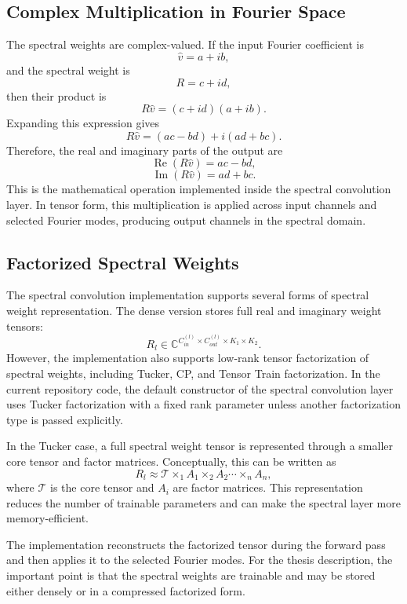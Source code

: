 \documentclass[14pt]{extarticle}
\begin{document}
\subsection{Complex Multiplication in Fourier Space}

The spectral weights are complex-valued. If the input Fourier coefficient is
\[
\hat{v}
=
a + ib,
\]
and the spectral weight is
\[
R
=
c + id,
\]
then their product is
\[
R\hat{v}
=
(c+id)(a+ib).
\]
Expanding this expression gives
\[
R\hat{v}
=
(ac-bd)
+
i(ad+bc).
\]
Therefore, the real and imaginary parts of the output are
\[
\operatorname{Re}(R\hat{v})
=
ac-bd,
\]
\[
\operatorname{Im}(R\hat{v})
=
ad+bc.
\]
This is the mathematical operation implemented inside the spectral convolution layer. In tensor form, this multiplication is applied across input channels and selected Fourier modes, producing output channels in the spectral domain.

\subsection{Factorized Spectral Weights}

The spectral convolution implementation supports several forms of spectral weight representation. The dense version stores full real and imaginary weight tensors:
\[
R_l
\in
\mathbb{C}^{C_{in}^{(l)} \times C_{out}^{(l)} \times K_1 \times K_2}.
\]
However, the implementation also supports low-rank tensor factorization of spectral weights, including Tucker, CP, and Tensor Train factorization. In the current repository code, the default constructor of the spectral convolution layer uses Tucker factorization with a fixed rank parameter unless another factorization type is passed explicitly.

In the Tucker case, a full spectral weight tensor is represented through a smaller core tensor and factor matrices. Conceptually, this can be written as
\[
R_l
\approx
\mathcal{T}
\times_1 A_1
\times_2 A_2
\cdots
\times_n A_n,
\]
where \(\mathcal{T}\) is the core tensor and \(A_i\) are factor matrices. This representation reduces the number of trainable parameters and can make the spectral layer more memory-efficient.

The implementation reconstructs the factorized tensor during the forward pass and then applies it to the selected Fourier modes. For the thesis description, the important point is that the spectral weights are trainable and may be stored either densely or in a compressed factorized form.
\end{document}

